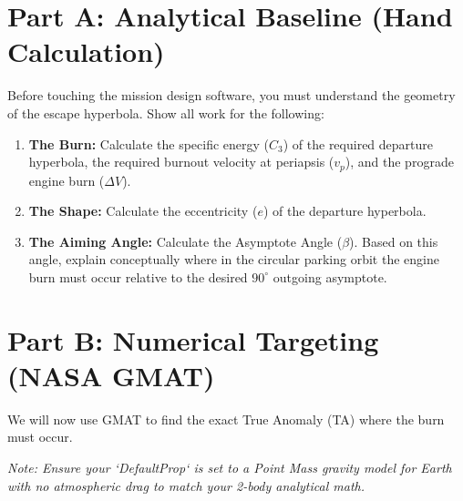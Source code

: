 \documentclass[12pt]{article}
\begin{document}
\section*{Part A: Analytical Baseline (Hand Calculation)}
Before touching the mission design software, you must understand the geometry of the escape hyperbola. Show all work for the following:
\begin{enumerate}
    \item \textbf{The Burn:} Calculate the specific energy ($C_3$) of the required departure hyperbola, the required burnout velocity at periapsis ($v_p$), and the prograde engine burn ($\Delta V$).
    \item \textbf{The Shape:} Calculate the eccentricity ($e$) of the departure hyperbola.
    \item \textbf{The Aiming Angle:} Calculate the Asymptote Angle ($\beta$). Based on this angle, explain conceptually where in the circular parking orbit the engine burn must occur relative to the desired $90^\circ$ outgoing asymptote.
\end{enumerate}

\newpage

\section*{Part B: Numerical Targeting (NASA GMAT)}
We will now use GMAT to find the exact True Anomaly (TA) where the burn must occur. 

\textit{Note: Ensure your `DefaultProp` is set to a Point Mass gravity model for Earth with no atmospheric drag to match your 2-body analytical math.}
\end{document}

